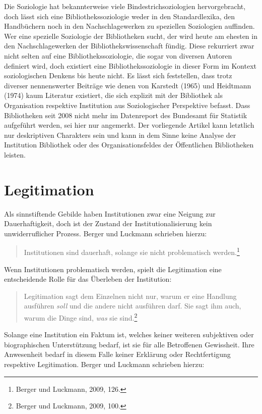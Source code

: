 \documentclass[a4paper,
fontsize=11pt,
oneside,
numbers=noperiodatend,
parskip=half-,
bibliography=totoc,
final
]{scrartcl}
\begin{document}
Die Soziologie hat bekannterweise viele Bindestrichsoziologien
hervorgebracht, doch lässt sich eine Bibliothekssoziologie weder in den
Standardlexika, den Handbüchern noch in den Nachschlagewerken zu
speziellen Soziologien auffinden. Wer eine spezielle Soziologie der
Bibliotheken sucht, der wird heute am ehesten in den Nachschlagewerken
der Bibliothekswissenschaft fündig. Diese rekurriert zwar nicht selten
auf eine Bibliothekssoziologie, die sogar von diversen Autoren definiert
wird, doch existiert eine Bibliothekssoziologie in dieser Form im
Kontext soziologischen Denkens bis heute nicht. Es lässt sich
feststellen, dass trotz diverser nennenswerter Beiträge wie denen von
Karstedt (1965) und Heidtmann (1974) kaum Literatur existiert, die sich
explizit mit der Bibliothek als Organisation respektive Institution aus
Soziologischer Perspektive befasst. Dass Bibliotheken seit 2008 nicht
mehr im Datenreport des Bundesamt für Statistik aufgeführt werden, sei
hier nur angemerkt. Der vorliegende Artikel kann letztlich nur
deskriptiven Charakters sein und kann in dem Sinne keine Analyse der
Institution Bibliothek oder des Organisationsfeldes der Öffentlichen
Bibliotheken leisten.

\section*{Legitimation}\label{legitimation}

Als sinnstiftende Gebilde haben Institutionen zwar eine Neigung zur
Dauerhaftigkeit, doch ist der Zustand der Institutionalisierung kein
unwiderruflicher Prozess. Berger und Luckmann schrieben hierzu:

\begin{quote}
Institutionen sind dauerhaft, solange sie nicht problematisch
werden.\footnote{Berger und Luckmann, 2009, 126.}
\end{quote}

Wenn Institutionen problematisch werden, spielt die Legitimation eine
entscheidende Rolle für das Überleben der Institution:

\begin{quote}
Legitimation sagt dem Einzelnen nicht nur, warum er eine Handlung
ausführen \emph{soll} und die andere nicht ausführen darf. Sie sagt ihm
auch, warum die Dinge sind, \emph{was} sie sind.\footnote{Berger und
  Luckmann, 2009, 100.}
\end{quote}

Solange eine Institution ein Faktum ist, welches keiner weiteren
subjektiven oder biographischen Unterstützung bedarf, ist sie für alle
Betroffenen Gewissheit. Ihre Anwesenheit bedarf in diesem Falle keiner
Erklärung oder Rechtfertigung respektive Legitimation. Berger und
Luckmann schrieben hierzu:
\end{document}
